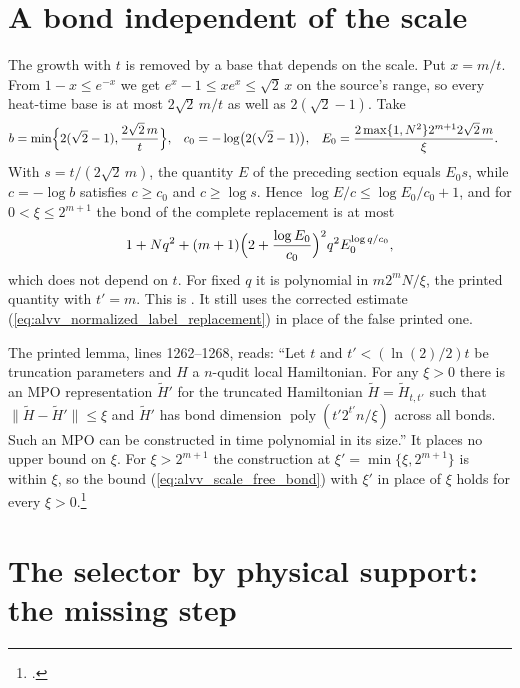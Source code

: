 \documentclass{article}
\begin{document}
\section{A bond independent of the scale}
\label{sec:alvv_scale_free_bond}

The growth with $t$ is removed by a base that depends on the scale. Put
$x=m/t$. From $1-x\leq e^{-x}$ we get $e^x-1\leq xe^x\leq\sqrt2\,x$ on the
source's range, so every heat-time base is at most $2\sqrt2\,m/t$ as well as
$2(\sqrt2-1)$. Take
\begin{align}
    b   & =\min\Bigl\{2(\sqrt2-1),\frac{2\sqrt2\,m}{t}\Bigr\}, &
    c_0 & =-\log\bigl(2(\sqrt2-1)\bigr),                        &
    E_0 & =\frac{2\max\{1,N^2\}2^{m+1}2\sqrt2\,m}{\xi}.
\end{align}
With $s=t/(2\sqrt2\,m)$, the quantity $E$ of the preceding section equals
$E_0s$, while $c=-\log b$ satisfies $c\geq c_0$ and $c\geq\log s$. Hence
$\log E/c\leq\log E_0/c_0+1$, and for $0<\xi\leq2^{m+1}$ the bond of the
complete replacement is at most
\begin{align}
    1+Nq^2+(m+1)\Bigl(2+\frac{\log E_0}{c_0}\Bigr)^2q^2E_0^{\log q/c_0},
    \label{eq:alvv_scale_free_bond}
\end{align}
which does not depend on $t$. For fixed $q$ it is polynomial in $m2^mN/\xi$,
the printed quantity with $t'=m$. This is
.
It still uses the corrected estimate
(\ref{eq:alvv_normalized_label_replacement}) in place of the false printed
one.

The printed lemma, lines 1262--1268, reads: ``Let $t$ and $t'<(\ln(2)/2)t$
be truncation parameters and $H$ a $n$-qudit local Hamiltonian. For any
$\xi>0$ there is an MPO representation $\tilde H'$ for the truncated
Hamiltonian $\tilde H=\tilde H_{t,t'}$ such that $\|\tilde H-\tilde H'\|\le\xi$
and $\tilde H'$ has bond dimension $\operatorname{poly}(t'2^{t'}n/\xi)$ across
all bonds. Such an MPO can be constructed in time polynomial in its size.''
It places no upper bound on $\xi$. For $\xi>2^{m+1}$ the construction at
$\xi'=\min\{\xi,2^{m+1}\}$ is within $\xi$, so the bound
(\ref{eq:alvv_scale_free_bond}) with $\xi'$ in place of $\xi$ holds for every
$\xi>0$.\footnote{.}

\section{The selector by physical support: the missing step}
\label{sec:alvv_physical_selector_gap}
\end{document}
